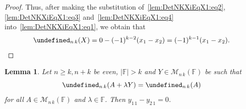 \documentclass{elsarticle}
\def\F{{\mathbb F}}
\def\M{{\mathcal M}}
\let\det\undefined
\DeclareMathOperator{\det}{det}
\theoremstyle{plain}
\newtheorem{lemma}[theorem]{Lemma}
\theoremstyle{definition}
\numberwithin{equation}{section}
\begin{document}
\begin{proof}
Thus, after making the substitution of~\eqref{lem:DetNKXiEqX1:eq2}, \eqref{lem:DetNKXiEqX1:eq3} and~\eqref{lem:DetNKXiEqX1:eq4} into~\eqref{lem:DetNKXiEqX1:eq1}, we  obtain that
\[
\det_{n\,k}(X) = 0 - (-1)^{k-2}(x_1 - x_2) = (-1)^{k-1}(x_1 - x_2).
\]
\end{proof}

\begin{lemma}\label{lem:NKEvenAdditionPreserverHasZero11Odd}Let $n \ge k, n + k$ be even, $|\F| > k$ and $Y \in \M_{n\, k} (\F)$ be such that
\begin{equation}\label{lem:NKEvenAdditionPreserverHasZero11Odd:cond}
\det_{n\, k} (A + \lambda Y) = \det_{n\, k} (A)
\end{equation}
for all $A \in \M_{n\, k}(\F)$ and $\lambda \in \F$. Then $y_{1\,1} - y_{2\,1} = 0$.
\end{lemma}
\end{document}
